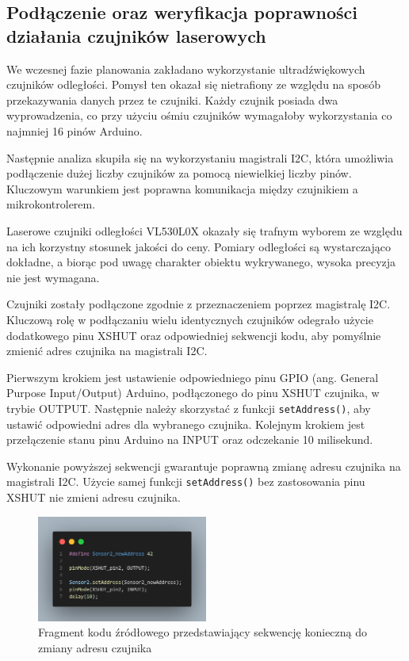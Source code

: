 \documentclass{report}
\begin{document}
\subsection{\Large Podłączenie oraz weryfikacja poprawności działania czujników laserowych}

%
%
We wczesnej fazie planowania zakładano wykorzystanie ultradźwiękowych czujników odległości. Pomysł ten okazał się nietrafiony ze względu na sposób przekazywania danych przez te czujniki. Każdy czujnik posiada dwa wyprowadzenia, co przy użyciu ośmiu czujników wymagałoby wykorzystania co najmniej 16 pinów Arduino.

Następnie analiza skupiła się na wykorzystaniu magistrali I2C, która umożliwia podłączenie dużej liczby czujników za pomocą niewielkiej liczby pinów. Kluczowym warunkiem jest poprawna komunikacja między czujnikiem a mikrokontrolerem.

Laserowe czujniki odległości VL530L0X okazały się trafnym wyborem ze względu na ich korzystny stosunek jakości do ceny. Pomiary odległości są wystarczająco dokładne, a biorąc pod uwagę charakter obiektu wykrywanego, wysoka precyzja nie jest wymagana.

Czujniki zostały podłączone zgodnie z przeznaczeniem poprzez magistralę I2C. Kluczową rolę w podłączaniu wielu identycznych czujników odegrało użycie dodatkowego pinu XSHUT oraz odpowiedniej sekwencji kodu, aby pomyślnie zmienić adres czujnika na magistrali I2C. 

Pierwszym krokiem jest ustawienie odpowiedniego pinu GPIO (ang. General Purpose Input/Output) Arduino, podłączonego do pinu XSHUT czujnika, w trybie OUTPUT. Następnie należy skorzystać z funkcji \texttt{setAddress()}, aby ustawić odpowiedni adres dla wybranego czujnika. Kolejnym krokiem jest przełączenie stanu pinu Arduino na INPUT oraz odczekanie 10 milisekund.

Wykonanie powyższej sekwencji gwarantuje poprawną zmianę adresu czujnika na magistrali I2C. Użycie samej funkcji \texttt{setAddress()} bez zastosowania pinu XSHUT nie zmieni adresu czujnika.

\begin{figure}[H]
    \centering
    \includegraphics*[width=0.5\textwidth]{"src/code_snaps/sensor_init.png"}
    \caption{Fragment kodu źródłowego przedstawiający sekwencję konieczną do zmiany adresu czujnika}
    \label{fig:sensor_init}
\end{figure}
\end{document}
